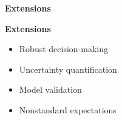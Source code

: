 \begin{frame}\begin{center}
\LARGE\textbf{Extensions}
\end{center}\end{frame}
\begin{frame}

\textbf{Extensions}\vspace{0.5cm}
\begin{itemize}\setlength\itemsep{1em}
\item Robust decision-making 
\item Uncertainty quantification 
\item Model validation  
\item Nonstandard expectations  
\end{itemize}
\end{frame}
